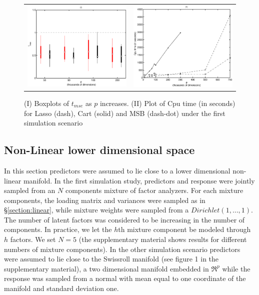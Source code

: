 \documentclass{article} %
\begin{document}
\begin{figure}
\centering
\begin{tabular}{ll}
\includegraphics[width=.5\linewidth]{boxplot_exp1.eps} &\includegraphics[width=.5\linewidth]{cpuTime_exp1.eps}

\end{tabular}
\caption{(I) Boxplots of $t_{mse}$ as $p$ increases. (II) Plot of Cpu time (in seconds) for Lasso (dash), Cart (solid) and MSB (dash-dot) under the first simulation scenario} \label{{boxplot:linear}}

\end{figure}


\subsection{Non-Linear lower dimensional space}

In this section predictors were assumed to lie close to a lower dimensional non-linear manifold. In the first simulation study, predictors and response were jointly sampled from an $N$ components mixture of factor analyzers. For each mixture components, the loading matrix and variances were sampled as in \S \ref{section:linear}, while mixture weights were sampled from a $Dirichlet(1, \dots, 1)$. The number of latent factors was considered to be increasing in the number of components. In practice, we let the $h$th mixture component be modeled through $h$ factors. We set $N=5$ (the supplementary material shows results for different numbers of mixture components). In the other simulation scenario predictors were assumed to lie close to the Swissroll manifold (see figure 1 in the supplementary material), a two dimensional manifold embedded in $\Re^p$ while the response was sampled from a normal with mean equal to one coordinate of the manifold and standard deviation one.
\end{document}
